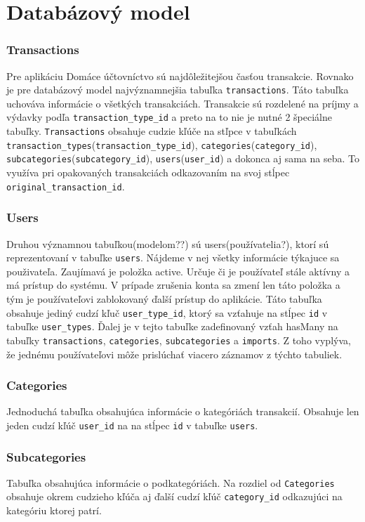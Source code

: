 \documentclass[12pt,onesided]{book}
\begin{document}
\section{Databázový model}
\subsubsection{Transactions}
Pre aplikáciu Domáce účtovníctvo sú najdôležitejšou časťou transakcie. Rovnako je pre databázový model najvýznamnejšia tabuľka \texttt{transactions}. Táto tabuľka uchováva informácie o všetkých transakciách. Transakcie sú rozdelené na príjmy a výdavky podľa \texttt{transaction\_type\_id} a preto na to nie je nutné 2 špeciálne tabuľky. \texttt{Transactions} obsahuje cudzie kľúče na stľpce v tabuľkách \texttt{transaction\_types}(\texttt{transaction\_\allowbreak type\_\allowbreak id}), \texttt{categories}(\texttt{category\_id}), \texttt{subcategories}(\texttt{subcategory\_id}), \texttt{users}(\texttt{user\_id}) a dokonca aj sama na seba. To využíva pri opakovaných transakciách odkazovaním na svoj stĺpec \texttt{original\_transaction\_id}.
\subsubsection{Users}
Druhou významnou tabuľkou(modelom??) sú users(používatelia?), ktorí sú reprezentovaní v tabuľke \texttt{users}. Nájdeme v nej všetky informácie týkajuce sa použivateľa. Zaujímavá je položka active. Určuje či je používateľ stále aktívny a má prístup do systému. V prípade zrušenia konta sa zmení len táto položka a tým je používateľovi zablokovaný ďalší prístup do aplikácie. Táto tabuľka obsahuje jediný cudzí kľuč \texttt{user\_type\_id}, ktorý sa vzťahuje na stĺpec \texttt{id} v tabuľke \texttt{user\_types}. Ďalej je v tejto tabuľke zadefinovaný vzťah hasMany na tabuľky \texttt{transactions}, \texttt{categories}, \texttt{subcategories} a \texttt{imports}. Z toho vyplýva, že jednému používateľovi môže prislúchať viacero záznamov z týchto tabuliek.
\subsubsection{Categories}
Jednoduchá tabuľka obsahujúca informácie o kategóriách transakcií. Obsahuje len jeden cudzí kľúč \texttt{user\_id} na na stĺpec \texttt{id} v tabuľke \texttt{users}. 
\subsubsection{Subcategories}
Tabuľka obsahujúca informácie o podkategóriách. Na rozdiel od \texttt{Categories} obsahuje okrem cudzieho kľúča aj ďalší cudzí kľúč \texttt{category\_id} odkazujúci na kategóriu ktorej patrí.
\end{document}
